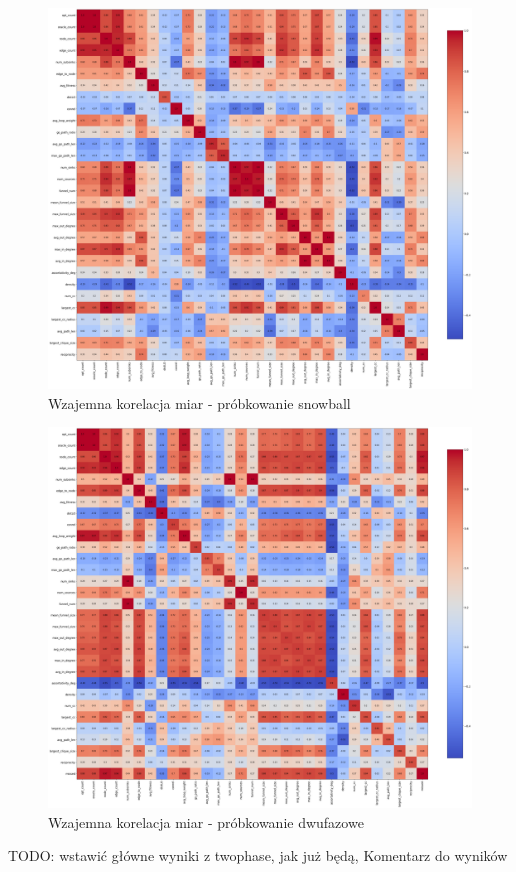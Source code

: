 \begin{figure}[h!]
    \centering
    \includegraphics[width=\textwidth]{chapters/experiments/img/snowball_corr.png}
    \caption{Wzajemna korelacja miar - próbkowanie snowball}
    \label{fig:corr_snowball}
\end{figure}

\begin{figure}[h!]
    \centering
    \includegraphics[width=\textwidth]{chapters/experiments/img/twophase_corr.png}
    \caption{Wzajemna korelacja miar - próbkowanie dwufazowe}
    \label{fig:corr_twophase}
\end{figure}

TODO: wstawić główne wyniki z twophase, jak już będą, Komentarz do wyników